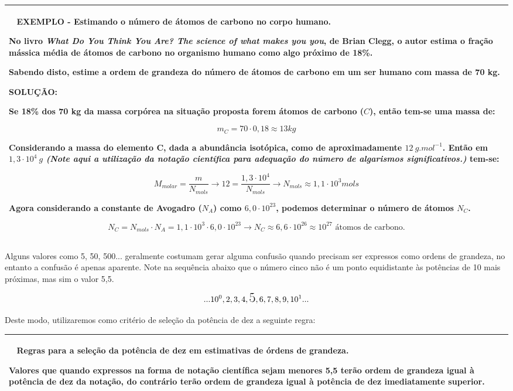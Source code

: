 \documentclass[a4paper, 11pt]{report}
\newenvironment{myboxed}
    {
        \begin{center}
        \begin{tabular}{p{0.7\textwidth}}
        \hline\
    }
    { 
        \\\hline
        \end{tabular} 
        \end{center}
    }
\begin{document}
\begin{myboxed}
    \textbf{EXEMPLO - Estimando o número de átomos de carbono no corpo humano.}

    No livro 
    \emph{What Do You Think You Are? The science of what makes you you}, de 
    Brian Clegg, o autor estima o fração mássica média de átomos de carbono no 
    organismo humano como algo próximo de 18\%. 

    Sabendo disto, estime a ordem de grandeza do número de átomos de carbono 
    em um ser humano com massa de 70 kg.

    \textbf{SOLUÇÃO:}

    Se 18\% dos 70 kg da massa corpórea na situação proposta forem átomos de 
    carbono ($C$), então tem-se uma massa de:
    
    $$
        m_C = 70 \cdot 0,18 \approx 13 kg
    $$

    Considerando a massa do elemento C, dada a abundância isotópica, como de 
    aproximadamente $12 \: g.mol^{-1}$. Então em $1,3 \cdot 10^4 \: g$
    \emph{
        (Note aqui a utilização da notação científica para adequação do número de
        algarismos significativos.)
    }
    tem-se:

    $$ 
        M_{molar} = \frac{m}{N_{mols}} \rightarrow 
        12 = \frac{1,3 \cdot 10^4}{N_{mols}} \rightarrow 
        N_{mols} \approx 1,1 \cdot 10^3 mols
    $$

    Agora considerando a constante de Avogadro ($N_A$) como $6,0 \cdot 10^{23}$, podemos
    determinar o número de átomos $N_C$.

    $$
        N_C = {N_{mols}}\cdot{N_A} = {1,1 \cdot 10^3}\cdot{6,0 \cdot 10^{23}} 
        \rightarrow N_C \approx 6,6 \cdot 10^{26}  \approx 10^{27} 
        \text{ átomos de carbono}.
    $$
 
\end{myboxed}

Alguns valores como 5, 50, 500... geralmente costumam gerar alguma confusão 
quando precisam ser expressos como ordens de grandeza, no entanto a confusão é 
apenas aparente. Note na sequência abaixo que o número cinco não é um ponto 
equidistante às potências de 10 mais próximas, mas sim o  valor 5,5.

$$
    ...10^0, 2, 3, 4, \text{\LARGE 5}, 6, 7, 8, 9, 10^1...
$$

Deste modo, utilizaremos como critério de seleção da potência de dez a seguinte
regra:

\begin{myboxed}
    \textbf{Regras para a seleção da potência de dez em estimativas de órdens
    de grandeza.}

    Valores que quando expressos na forma de notação científica sejam menores
    5,5 terão ordem de grandeza igual à potência de dez da notação, do contrário
    terão ordem de grandeza igual à potência de dez imediatamente superior.
\end{myboxed}
\end{document}

